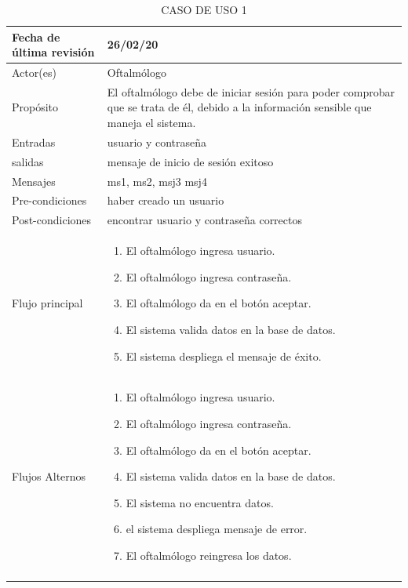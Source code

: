 \documentclass[10pt]{article}
\begin{document}
\begin{longtable}{|p{3.8cm}|p{10.8cm}|}
\hline
Fecha de última revisión & 26/02/20\\
\hline
Actor(es) & Oftalmólogo \\
\hline
Propósito & El oftalmólogo debe de iniciar sesión para poder comprobar que se trata de él, debido a la información sensible que maneja el sistema.\\
\hline
Entradas & usuario y contraseña\\
\hline
salidas & mensaje de inicio de sesión exitoso\\
\hline
Mensajes & ms1, ms2, msj3 msj4\\
\hline
Pre-condiciones & haber creado un usuario \\
\hline
Post-condiciones &  encontrar usuario y contraseña correctos \\
\hline
Flujo principal & \begin{enumerate}
    \item El oftalmólogo ingresa usuario.
    \item El oftalmólogo ingresa contraseña.
    \item El oftalmólogo da en el botón aceptar.
    \item El sistema valida datos en la base de datos.
    \item El sistema despliega el mensaje de éxito.
\end{enumerate}
    \\
\hline
Flujos Alternos &  \begin{enumerate}
    \item El oftalmólogo ingresa usuario.
    \item El oftalmólogo ingresa contraseña.
    \item El oftalmólogo da en el botón aceptar.
    \item El sistema valida datos en la base de datos.
    \item El sistema no encuentra datos.
    \item el sistema despliega mensaje de error.
    \item El oftalmólogo reingresa los datos.
\end{enumerate}\\
\hline
\caption{CASO DE USO 1}
\label{tabla1}
\end{longtable}

\newpage
\end{document}
